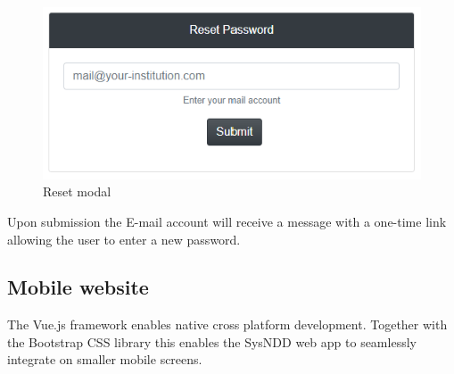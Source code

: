 \documentclass[
]{article}
\begin{document}
\begin{figure}
\centering
\includegraphics{./static/img/02_18-password-reset-modal.png}
\caption{Reset modal}
\end{figure}

Upon submission the E-mail account will receive a message with a one-time link allowing the user to enter a new password.

\hypertarget{mobile-website}{%
\subsection{Mobile website}\label{mobile-website}}

The Vue.js framework enables native cross platform development. Together with the Bootstrap CSS library this enables the SysNDD web app to seamlessly integrate on smaller mobile screens.
\end{document}

